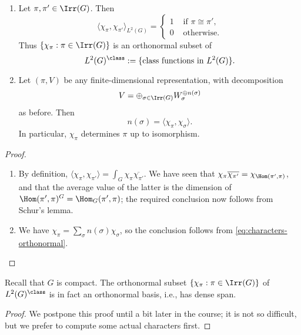 \documentclass[reqno]{amsart} 
\begin{document}
\begin{theorem}\label{thm:basic-orthogonality-characters}
  \begin{enumerate}
  \item Let $\pi, \pi ' \in \Irr(G)$.  Then
    \begin{equation}\label{eq:characters-orthonormal}
      \langle \chi_\pi, \chi_{\pi '} \rangle_{L^2(G)}
      = 
\begin{cases}
        1 & \text{ if $\pi \cong \pi '$}, \\
        0 & \text{ otherwise.}
      \end{cases}
    \end{equation}
    Thus $\{\chi_\pi : \pi \in \Irr(G)\}$ is an orthonormal subset of
    \begin{equation*}
L^2(G)^{\class} := \{\text{class functions in $L^2(G)$}\}.
    \end{equation*}
  \item Let $(\pi,V)$ be any finite-dimensional representation, with decomposition
    \begin{equation*}
V = \oplus_{\sigma \in \Irr(G)} W_\sigma ^{\oplus n(\sigma)}
\end{equation*}
 as before.  Then
 \begin{equation*}
   n(\sigma) = \langle \chi_\pi, \chi_\sigma  \rangle.
 \end{equation*}
 In particular, $\chi_\pi$ determines $\pi$ up to isomorphism.
\end{enumerate}
\end{theorem}
\begin{proof}
  \begin{enumerate}
  \item By definition, $\langle \chi_{\pi}, \chi_{\pi '} \rangle = \int_G \chi_\pi \overline{\chi_{\pi '}}$.  We have seen that $\chi_\pi \overline{\chi_{\pi '}} = \chi_{\Hom(\pi ', \pi)}$, and that the average value of the latter is the dimension of $\Hom(\pi ', \pi)^G = \Hom_G(\pi ', \pi)$; the required conclusion now follows from Schur's lemma.
  \item We have $\chi_\pi = \sum_\sigma n(\sigma) \chi_\sigma$, so the conclusion follows from \eqref{eq:characters-orthonormal}.
  \end{enumerate}
\end{proof}

\begin{theorem}\label{thm:peter-weyl-for-chars}
  Recall that $G$ is compact.  The orthonormal subset $\{\chi_\pi : \pi \in \Irr(G)\}$ of $L^2(G)^{\class}$ is in fact an orthonormal basis, i.e., has dense span.
\end{theorem}
\begin{proof}
  We postpone this proof until a bit later in the course; it is not so difficult, but we prefer to compute some actual characters first.
\end{proof}
\end{document}
